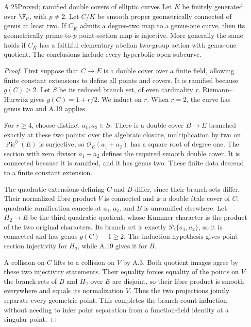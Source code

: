 \begin{claim}{A.25}{Proved; ramified double covers of elliptic curves}
Let $K$ be finitely generated over $\F_p$, with $p\ne2$.
Let $C/K$ be smooth proper geometrically connected of genus
at least two. If $C_{\overline K}$ admits a degree-two map
to a genus-one curve, then its geometrically prime-to-$p$
point-section map is injective. More generally the same
holds if $C_{\overline K}$ has a faithful elementary
abelian two-group action with genus-one quotient. The
conclusions include every hyperbolic open subcurve.
\end{claim}
\begin{proof}
First suppose that $C\to E$ is a double cover over a
finite field, allowing finite constant extensions to define
all points and covers. It is ramified because $g(C)\ge2$.
Let $S$ be its reduced branch set, of even cardinality $r$.
Riemann--Hurwitz gives $g(C)=1+r/2$. We induct on $r$.
When $r=2$, the curve has genus two and A.19 applies.

For $r\ge4$, choose distinct $a_1,a_2\in S$. There is a
double cover $B\to E$ branched exactly at these two
points: over the algebraic closure, multiplication by two
on $\operatorname{Pic}^0(E)$ is surjective, so
$\mathcal O_E(a_1+a_2)$ has a square root of degree one.
The section with zero divisor $a_1+a_2$ defines the
required smooth double cover. It is connected because it
is ramified, and it has genus two. These finite data descend
to a finite constant extension.

The quadratic extensions defining $C$ and $B$ differ,
since their branch sets differ. Their normalized fibre
product $V$ is connected and is a double \'etale cover of
$C$: quadratic ramification cancels at $a_1,a_2$, and
$B$ is unramified elsewhere. Let $H_2\to E$ be the third
quadratic quotient, whose Kummer character is the product
of the two original characters. Its branch set is exactly
$S\setminus\{a_1,a_2\}$, so it is connected and has genus
$g(C)-1\ge2$. The induction hypothesis gives point-section
injectivity for $H_2$, while A.19 gives it for $B$.

A collision on $C$ lifts to a collision on $V$ by A.3.
Both quotient images agree by these two injectivity
statements. Their equality forces equality of the points
on $V$: the branch sets of $B$ and $H_2$ over $E$ are
disjoint, so their fibre product is smooth everywhere and
equals its normalization $V$. Thus the two projections
jointly separate every geometric point. This completes
the branch-count induction without needing to infer point
separation from a function-field identity at a singular
point.


\end{proof}
